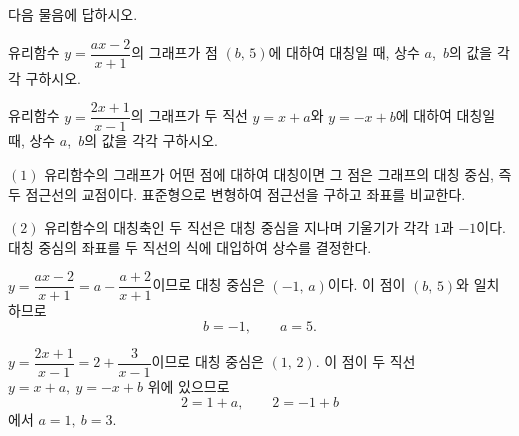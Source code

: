 \documentclass[10pt]{article}
\begin{document}
\begin{dmproblem}
다음 물음에 답하시오.

\vspace{3mm}

 유리함수 $y = \dfrac{ax - 2}{x + 1}$의 그래프가 점 $(b,\, 5)$에 대하여 대칭일 때, 상수 $a$,\ $b$의 값을 각각 구하시오.

 유리함수 $y = \dfrac{2x + 1}{x - 1}$의 그래프가 두 직선 $y = x + a$와 $y = -x + b$에 대하여 대칭일 때, 상수 $a$,\ $b$의 값을 각각 구하시오.
\end{dmproblem}

\begin{dmapproach}
$(1)$ 유리함수의 그래프가 어떤 점에 대하여 대칭이면 그 점은 그래프의 대칭 중심, 즉 두 점근선의 교점이다. 표준형으로 변형하여 점근선을 구하고 좌표를 비교한다.

$(2)$ 유리함수의 대칭축인 두 직선은 대칭 중심을 지나며 기울기가 각각 $1$과 $-1$이다. 대칭 중심의 좌표를 두 직선의 식에 대입하여 상수를 결정한다.
\end{dmapproach}

\begin{dmsolution}
 $y = \dfrac{ax - 2}{x + 1} = a - \dfrac{a + 2}{x + 1}$이므로 대칭 중심은 $(-1,\, a)$이다. 이 점이 $(b,\, 5)$와 일치하므로
$$b = -1,\qquad a = 5.$$

 $y = \dfrac{2x + 1}{x - 1} = 2 + \dfrac{3}{x - 1}$이므로 대칭 중심은 $(1,\, 2)$. 이 점이 두 직선 $y = x + a,\ y = -x + b$ 위에 있으므로
$$2 = 1 + a,\qquad 2 = -1 + b$$
에서 $a = 1,\ b = 3$.
\end{dmsolution}

\dmchecktitle



\newpage

\end{document}
